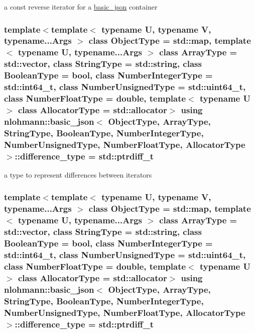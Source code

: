 a const reverse iterator for a \hyperlink{classnlohmann_1_1basic__json}{basic\-\_\-json} container 

\hypertarget{classnlohmann_1_1basic__json_aec316934a555dd1acdd3600e5d4a4cdf}{
\subsubsection[{difference\-\_\-type}]{\setlength{\rightskip}{0pt plus 5cm}template$<$template$<$ typename U, typename V, typename...\-Args $>$ class Object\-Type = std\-::map, template$<$ typename U, typename...\-Args $>$ class Array\-Type = std\-::vector, class String\-Type  = std\-::string, class Boolean\-Type  = bool, class Number\-Integer\-Type  = std\-::int64\-\_\-t, class Number\-Unsigned\-Type  = std\-::uint64\-\_\-t, class Number\-Float\-Type  = double, template$<$ typename U $>$ class Allocator\-Type = std\-::allocator$>$ using {\bf nlohmann\-::basic\-\_\-json}$<$ Object\-Type, Array\-Type, String\-Type, Boolean\-Type, Number\-Integer\-Type, Number\-Unsigned\-Type, Number\-Float\-Type, Allocator\-Type $>$\-::{\bf difference\-\_\-type} =  std\-::ptrdiff\-\_\-t}}\label{classnlohmann_1_1basic__json_aec316934a555dd1acdd3600e5d4a4cdf}


a type to represent differences between iterators 

\hypertarget{classnlohmann_1_1basic__json_aec316934a555dd1acdd3600e5d4a4cdf}{
\subsubsection[{difference\-\_\-type}]{\setlength{\rightskip}{0pt plus 5cm}template$<$template$<$ typename U, typename V, typename...\-Args $>$ class Object\-Type = std\-::map, template$<$ typename U, typename...\-Args $>$ class Array\-Type = std\-::vector, class String\-Type  = std\-::string, class Boolean\-Type  = bool, class Number\-Integer\-Type  = std\-::int64\-\_\-t, class Number\-Unsigned\-Type  = std\-::uint64\-\_\-t, class Number\-Float\-Type  = double, template$<$ typename U $>$ class Allocator\-Type = std\-::allocator$>$ using {\bf nlohmann\-::basic\-\_\-json}$<$ Object\-Type, Array\-Type, String\-Type, Boolean\-Type, Number\-Integer\-Type, Number\-Unsigned\-Type, Number\-Float\-Type, Allocator\-Type $>$\-::{\bf difference\-\_\-type} =  std\-::ptrdiff\-\_\-t}}\label{classnlohmann_1_1basic__json_aec316934a555dd1acdd3600e5d4a4cdf}


